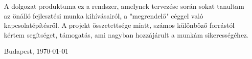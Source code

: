 A dolgozat produktuma ez a rendszer, amelynek tervezése során sokat tanultam az önálló fejlesztési munka kihívásairól, a "megrendelő" céggel való kapcsolatépítésről. A projekt összetettsége miatt, számos különböző forrástól kértem segítséget, támogatás, ami nagyban hozzájárult a munkám sikerességéhez.


\vspace{0.5cm}

\begin{flushleft}
{Budapest, \today}
\end{flushleft}

\begin{flushright}
\emph{\authorName}
\end{flushright}

\vfill
